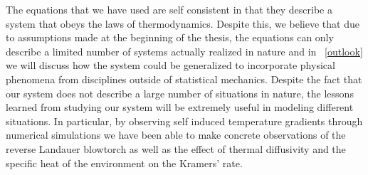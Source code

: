 %


The equations that we have used are self consistent in that they describe a system that obeys the laws of thermodynamics. Despite this, we believe that due to assumptions made at the beginning of the thesis, the equations can only describe a limited number of systems actually realized in nature and in ~\autoref{outlook} we will discuss how the system could be generalized to incorporate physical phenomena from disciplines outside of statistical mechanics. Despite the fact that our system does not describe a large number of situations in nature, the lessons learned from studying our system will be extremely useful in modeling different situations. In particular, by observing self induced temperature gradients through numerical simulations we have been able to make concrete observations of the reverse Landauer blowtorch as well as the effect of thermal diffusivity and the specific heat of the environment on the Kramers' rate.  

